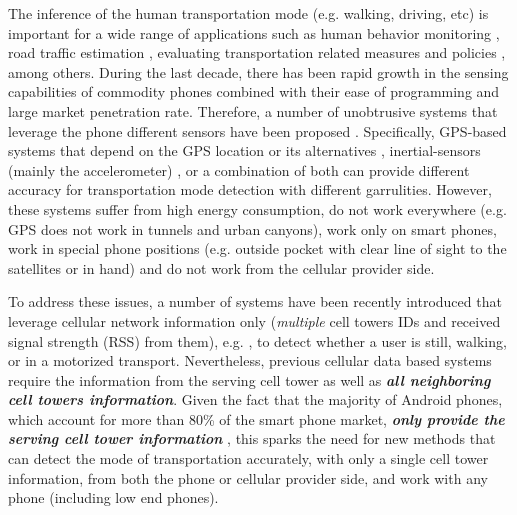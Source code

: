 \documentclass[conference]{IEEEtran}
\begin{document}
The inference  of the human transportation mode (e.g. walking, driving, etc) is important for a wide range of applications such as human behavior monitoring \cite{consolvo2008activity}, road traffic estimation \cite{snapnet}, evaluating transportation related measures and policies \cite{mohan2008nericell,aly_map14,sheikh2014demonstrating}, among others. During the last decade, there has been rapid growth in the sensing capabilities of commodity phones combined with their ease of programming and large market penetration rate. Therefore, a number of unobtrusive systems that leverage the phone different sensors have been proposed  \cite{stenneth11,widhalm2012transport,lu2010jigsaw,bolbol2012inferring,miluzzo2008sensing,Wang2010,yang2009toward}. Specifically, GPS-based systems \cite{stenneth11,widhalm2012transport,lu2010jigsaw,bolbol2012inferring} that depend on the GPS location or its alternatives \cite{ibrahim2011hidden,cellsense,ibrahim2010cellsense,ibrahim2013enabling,aly2013dejavu,GAC}, inertial-sensors (mainly the accelerometer) \cite{miluzzo2008sensing,Wang2010,yang2009toward}, or a combination of both can provide different accuracy for transportation mode detection with different garrulities. However, these systems suffer from high energy consumption, do not work everywhere (e.g. GPS does not work in tunnels and urban canyons), work only on smart phones, work in special phone positions (e.g. outside pocket with clear line of sight to the satellites or in hand) and do not work from the cellular provider side.

To address these issues, a number of systems have been recently introduced that leverage cellular network information only (\emph{multiple} cell towers IDs and received signal strength (RSS) from them), e.g. \cite{anderson2006practical,Sohn06,reddy10,Kassem:VTC12,al2012rf}, to detect whether a user is still, walking, or in a motorized transport. Nevertheless, previous cellular data based systems require the information from the serving cell tower as well as \textbf{\emph{all neighboring cell towers information}}. Given the fact that the majority of Android phones, which account for more than 80\% of the smart phone market, \textbf{\emph{only provide the serving cell tower information }}\cite{webstatandroid2}, this sparks the  need for new methods that can detect the mode of transportation accurately, with only a single cell tower information, from both the phone or cellular provider side, and work with any phone (including low end phones).
\end{document}
